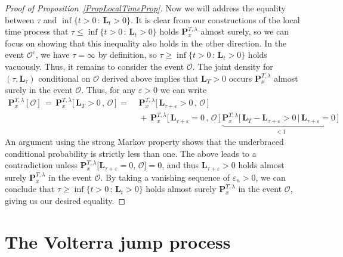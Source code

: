 \documentclass[10pt]{article}
\numberwithin{equation}{section}
\theoremstyle{definition}
\begin{document}
\begin{proof}[Proof of Proposition~\ref{PropLocalTimeProp}]
Now we will address the equality between $\tau$ and $\inf\{t>0\,:\,\mathbf{L}_t>0  \}$.   It is clear  from our  constructions of the  local time process that
$\tau\leq \inf\{t>0\,:\,\mathbf{L}_t>0  \}$ holds $\mathbf{P}_{x }^{T,\lambda}$ almost surely, so we can focus on showing that this inequality also holds in the other direction.  In the event  $\mathcal{O}^c$, we have $\tau=\infty$ by definition, so $\tau\geq \inf\{t>0\,:\,\mathbf{L}_t>0  \}$ holds vacuously. Thus, it remains to consider the event $\mathcal{O}$.
The joint density for $(\tau,\mathbf{L}_{\tau})$ conditional on $\mathcal{O}$ derived above implies that $\mathbf{L}_T>0$ occurs $\mathbf{P}_{x }^{T,\lambda}$ almost surely in the event $\mathcal{O}$. 
Thus, for any $\varepsilon>0$ we can write
\begin{align*}
 \mathbf{P}_{x }^{T,\lambda}[ \mathcal{O}]\,=\,    \mathbf{P}_{x }^{T,\lambda}\big[\,\mathbf{L}_T >0\,, \,\mathcal{O}\,\big]\,=\,&\,\mathbf{P}_{x }^{T,\lambda}\big[\, \mathbf{L}_{\tau+\varepsilon} >0\, , \,\mathcal{O}\,\big]\\ &\,+\,\mathbf{P}_{x }^{T,\lambda}\big[ \,\mathbf{L}_{\tau+\varepsilon} =0\, , \,\mathcal{O}\,\big]\, \underbrace{\mathbf{P}_{x }^{T,\lambda}\big[\,\mathbf{L}_T -\mathbf{L}_{\tau+\varepsilon}>0 \,\big| \,  \mathbf{L}_{\tau+\varepsilon} =0\,\big]}_{ <1}
\end{align*}
An  argument using the strong Markov property   shows that the underbraced conditional probability is strictly less than one. The above leads to a contradiction unless $\mathbf{P}_{x }^{T,\lambda}\big[ \mathbf{L}_{\tau+\varepsilon} =0 , \,\mathcal{O}\big]=0$, and thus $ \mathbf{L}_{\tau+\varepsilon}>0$ holds almost surely $\mathbf{P}_{x }^{T,\lambda}$  in the event $\mathcal{O}$.  By taking a vanishing sequence of $\varepsilon_n>0$, we can conclude that $\tau\geq \inf\{t>0\,:\,\mathbf{L}_t>0  \}$ holds  almost surely $\mathbf{P}_{x }^{T,\lambda}$ in the event $\mathcal{O}$, giving us our desired equality. 
\end{proof}





\section{The Volterra jump process}\label{SectionRightCont}
\end{document}
